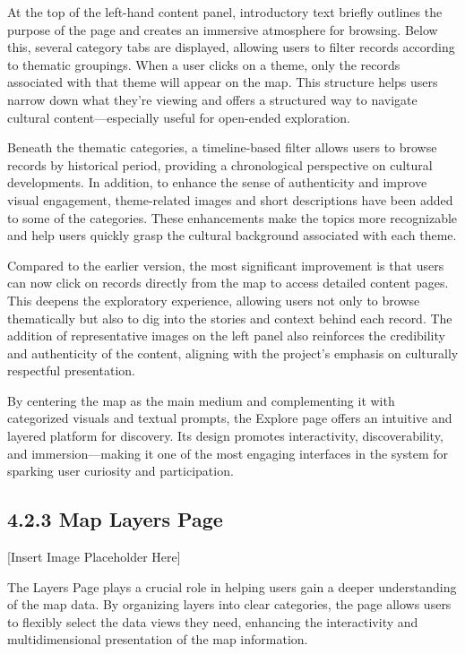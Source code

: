 At the top of the left-hand content panel, introductory text briefly outlines the purpose of the page and creates an immersive atmosphere for browsing. Below this, several category tabs are displayed, allowing users to filter records according to thematic groupings. When a user clicks on a theme, only the records associated with that theme will appear on the map. This structure helps users narrow down what they're viewing and offers a structured way to navigate cultural content—especially useful for open-ended exploration.

Beneath the thematic categories, a timeline-based filter allows users to browse records by historical period, providing a chronological perspective on cultural developments. In addition, to enhance the sense of authenticity and improve visual engagement, theme-related images and short descriptions have been added to some of the categories. These enhancements make the topics more recognizable and help users quickly grasp the cultural background associated with each theme.

Compared to the earlier version, the most significant improvement is that users can now click on records directly from the map to access detailed content pages. This deepens the exploratory experience, allowing users not only to browse thematically but also to dig into the stories and context behind each record. The addition of representative images on the left panel also reinforces the credibility and authenticity of the content, aligning with the project's emphasis on culturally respectful presentation.

By centering the map as the main medium and complementing it with categorized visuals and textual prompts, the Explore page offers an intuitive and layered platform for discovery. Its design promotes interactivity, discoverability, and immersion—making it one of the most engaging interfaces in the system for sparking user curiosity and participation.

\subsection*{4.2.3 Map Layers Page}
[Insert Image Placeholder Here]

The Layers Page plays a crucial role in helping users gain a deeper understanding of the map data. By organizing layers into clear categories, the page allows users to flexibly select the data views they need, enhancing the interactivity and multidimensional presentation of the map information.

